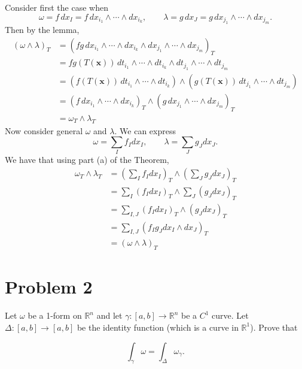 \documentclass[11pt]{article}
\begin{document}
\begin{solution}
Consider first the case when 
\[\omega = f\,dx_I = f\,dx_{i_1}\wedge \cdots \wedge dx_{i_k}, \qquad \lambda = g\,dx_J = g\,dx_{j_1}\wedge \cdots \wedge dx_{j_m}.\] Then by the lemma, 
\begin{align*}
(\omega\wedge\lambda)_T &=  (fg\,dx_{i_1}\wedge \cdots \wedge dx_{i_k}\wedge dx_{j_{1}}\wedge \cdots \wedge dx_{j_{m}})_T\\
&= fg(T(\textbf{x}))\,dt_{i_1}\wedge \cdots \wedge dt_{i_k}\wedge dt_{j_{1}}\wedge \cdots \wedge dt_{j_{m}}\\
&= (f(T(\textbf{x}))\,dt_{i_1}\wedge \cdots \wedge dt_{i_k}) \wedge (g(T(\textbf{x}))\,dt_{j_{1}}\wedge \cdots \wedge dt_{j_{m}})\\
&= (f\,dx_{i_1}\wedge\cdots\wedge dx_{i_k})_T\wedge (g\,dx_{j_{1}}\wedge \cdots \wedge dx_{j_{m}})_T\\
&= \omega_T \wedge \lambda_T
\end{align*}
Now consider general $\omega$ and $\lambda.$ We can express 
\[\omega = \sum_I f_I dx_I, \qquad \lambda = \sum_J g_J dx_J.\] We have that using part (a) of the Theorem,
\begin{align*}
    \omega_T \wedge \lambda_T &= (\sum_I f_I dx_I)_T \wedge (\sum_J g_J dx_J)_T\\
    &= \sum_I (f_I dx_I)_T  \wedge \sum_J (g_J dx_J)_T\\
    &= \sum_{I,J}(f_Idx_I)_T\wedge (g_J dx_J)_T \\
    &= \sum_{I,J} (f_I g_J dx_I \wedge dx_J)_T\\
    &= (\omega \wedge \lambda)_T
\end{align*}


\end{solution}

\newpage

\section*{Problem 2}

Let $\omega$ be a 1-form on $\mathbb{R}^n$ and let $\gamma : [a, b] \to \mathbb{R}^n$ be a $C^1$ curve. Let $\Delta : [a, b] \to [a, b]$ be the identity function (which is a curve in $\mathbb{R}^1$). Prove that

\[
\int_{\gamma} \omega = \int_{\Delta} \omega_{\gamma}.
\]
\end{document}
